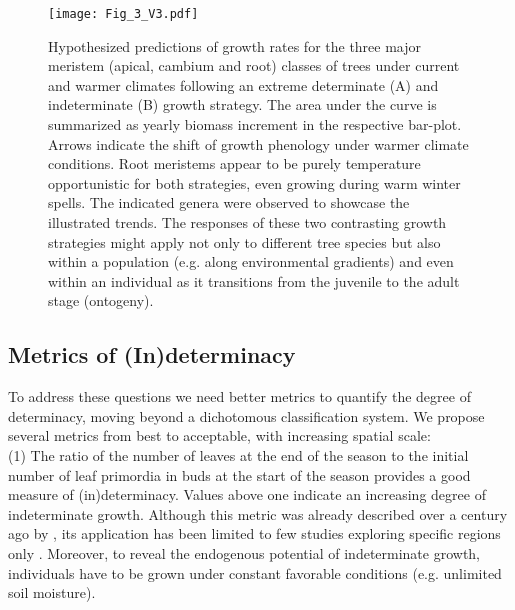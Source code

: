 \documentclass{article}
\begin{document}

							\begin{figure}
							\centering
							\texttt{[image: Fig\_3\_V3.pdf]} 
							\caption{Hypothesized predictions of growth rates for the three major meristem (apical, cambium and root) classes of trees under current and warmer climates following an extreme determinate (A) and indeterminate (B) growth strategy. The area under the curve is summarized as yearly biomass increment in the respective bar-plot. Arrows indicate the shift of growth phenology under warmer climate conditions. Root meristems appear to be purely temperature opportunistic for both strategies, even growing during warm winter spells. The indicated genera were observed to showcase the illustrated trends. The responses of these two contrasting growth strategies might apply not only to different tree species but also within a population (e.g. along environmental gradients) and even within an individual as it transitions from the juvenile to the adult stage (ontogeny).}
							\label{fig:fig_3xxx}
						\end{figure}

	
	\subsection*{Metrics of (In)determinacy} %
	To address these questions we need better metrics to quantify the degree of determinacy, moving beyond a dichotomous classification system. We propose several metrics from best to acceptable, with increasing spatial scale: \\
	
	(1) The ratio of the number of leaves at the end of the season to the initial number of leaf primordia in buds at the start of the season provides a good measure of (in)determinacy. Values above one indicate an increasing degree of indeterminate growth. Although this metric was already described over a century ago by \citet{mooreStudyWinterBuds1909}, its application has been limited to few studies exploring specific regions only \citep{damascosBudCompositionBranching2005, kikuzawaLeafSurvivalWoody1983, guedonRelativeExtentsPreformation2006}. Moreover, to reveal the endogenous potential of indeterminate growth, individuals have to be grown under constant favorable conditions (e.g. unlimited soil moisture).\\
	
\end{document}
